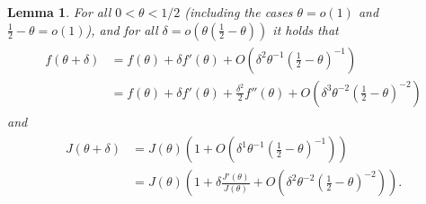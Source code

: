 \documentclass[10pt,a4paper]{amsart}
\newtheorem{lemma}{Lemma}
\begin{document}
\begin{lemma}\label{lem_taylor_f_J}
For all $0<\theta<1/2$ (including the cases $\theta=o(1)$ and $\frac 1 2 -\theta =o(1)$), and for all $\delta=o\left(\theta\left(\frac 1 2 -\theta\right)\right)$ it holds that
\begin{align}
\begin{aligned}
f(\theta+\delta) 
    &= f(\theta)+\delta f'(\theta)+O\left(\delta^2\theta^{-1}\left(\frac 1 2 -\theta \right)^{-1}\right)\\
    &= f(\theta)+\delta f'(\theta)+\frac{\delta^2}{2}f''(\theta)+O\left(\delta^3\theta^{-2}\left(\frac 1 2 -\theta \right)^{-2}\right)
\end{aligned}
\label{eq_fshift}
\end{align}
and
\begin{align}
\begin{aligned}
J(\theta+\delta)
    &= J(\theta)\left(1+O\left(\delta^{1}\theta^{-1}\left(\frac 1 2 -\theta \right)^{-1}\right)\right)\\
    &= J(\theta)\left(1+\delta\frac{J'(\theta)}{J(\theta)}+O\left(\delta^{2}\theta^{-2}\left(\frac 1 2 -\theta \right)^{-2}\right)\right).
\end{aligned}
\label{eq_Jshift}
\end{align}



\end{lemma}
\end{document}
